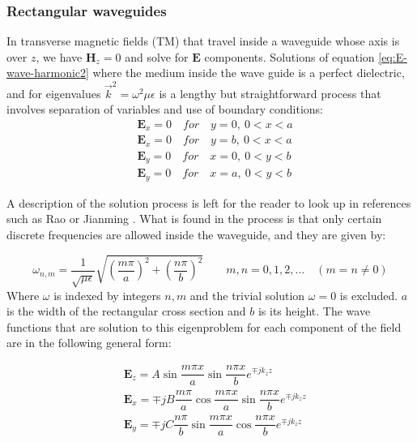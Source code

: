 \subsubsection{Rectangular waveguides} 

In transverse magnetic fields (TM) that travel inside a waveguide whose axis is over $z$, we have $\mathbf{H}_z = 0$ and solve for $\mathbf{E}$ components. 
Solutions of equation \ref{eq:E-wave-harmonic2} where the medium inside the wave guide is a perfect dielectric, and  for eigenvalues $\vec{k}^2 = \omega^2\mu\epsilon$ is a lengthy but straightforward process that involves separation of variables and use of boundary conditions:
\begin{align}
&\mathbf{E}_x = 0 \quad for \quad y=0,\ 0<x<a\\
&\mathbf{E}_x = 0 \quad for \quad y=b,\ 0<x<a\\
&\mathbf{E}_y = 0 \quad for \quad x=0,\ 0<y<b\\
&\mathbf{E}_y = 0 \quad for \quad x=a,\ 0<y<b
\label{eq:square_bc}
\end{align}

A description of the solution process is left for the reader to look up in references such as Rao  \cite{Rao2004} or Jianming \cite{Jin2010}. What is found in the process is that only certain discrete frequencies are allowed inside the waveguide, and they are given by:

\begin{equation}
\omega_{n,m} = \frac{1}{\sqrt{\mu\epsilon}}\sqrt{\left(\frac{m\pi}{a}\right)^2+\left(\frac{n\pi}{b}\right)^2}
\qquad m,n = 0,1,2,... \quad (m=n\neq0)
\label{eq:eig_vals_sqare_waveguide}
\end{equation}
Where $\omega$ is indexed by integers $n,m$ and the trivial solution $\omega = 0$ is excluded. $a$ is the width of the rectangular cross section and $b$ is its height.
The wave functions that are solution to this eigenproblem for each component of the field are in the following general form:

\begin{align}
&\mathbf{E}_z = A\sin{\dfrac{m\pi x}{a}}\sin{\dfrac{n\pi x}{b}}e^{\mp jk_zz} \label{eq:Ez_mag}\\
&\mathbf{E}_x =\mp jB\dfrac{m\pi}{a}\cos{\dfrac{m\pi x}{a}}\sin{\dfrac{n\pi x}{b}}e^{\mp jk_zz}\\
&\mathbf{E}_y =\mp jC\dfrac{n\pi}{b}\sin{\dfrac{m\pi x}{a}}\cos{\dfrac{n\pi x}{b}}e^{\mp jk_zz}
\end{align}

